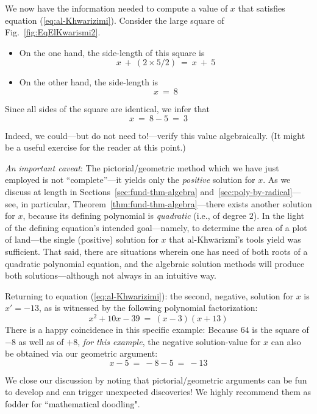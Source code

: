 \smallskip

We now have the information needed to compute a value of $x$ that satisfies equation (\ref{eq:al-Khwarizimi}).  Consider the large square of Fig.~\ref{fig:EqElKwarismi2}.

\begin{itemize}
\item
On the one hand, the side-length of this square is
\[ x \ + \ (2 \times 5/2) \ = \ x \ + \ 5 \]

\medskip\item
On the other hand, the side-length is
\[ x \ = \ 8 \]
\end{itemize}
Since all sides of the square are identical, we infer that
\[ x \ = \ 8-5 \ = \ 3 \]

\noindent
Indeed, we could---but do not need to!---verify this value algebraically.  (It might be a useful exercise for the reader at this point.)

\medskip

\noindent
{\em An important caveat}: The pictorial/geometric method which we have just employed is not ``complete''---it yields only the {\em positive} solution for $x$.  As we discuss at length in Sections~\ref{sec:fund-thm-algebra} and~\ref{sec:poly-by-radical}---see, in particular, Theorem~\ref{thm:fund-thm-algebra}---there exists another solution for $x$, because its defining polynomial is {\em quadratic} (i.e., of degree $2$).  In the light of the defining equation's intended goal---namely, to determine the area of a plot of land---the single (positive) solution for $x$ that al-Khw$\bar{\mbox{a}}$rizm$\bar{\mbox{i}}$'s tools yield was sufficient.  That said, there are situations wherein one has need of both roots of a quadratic polynomial equation, and the algebraic solution methods will produce both solutions---although not always in an intuitive way.

\medskip

Returning to equation (\ref{eq:al-Khwarizimi}):  the second, negative, solution for $x$  is $x' = -13$, as is witnessed by the following polynomial factorization:
\[ x^2 + 10x - 39 \ = \ (x-3)(x+13) \]
There is a happy coincidence in this specific example: Because $64$ is the square of $-8$ as well as of $+8$, {\em for this example}, the negative solution-value for $x$ can also be obtained via our geometric argument:
\[ x - 5 \ = \ -8 -5 \ = \ -13 \]

\medskip

We close our discussion by noting that pictorial/geometric arguments can be fun to develop and can trigger unexpected discoveries!  We highly recommend them as fodder for ``mathematical doodling".  



